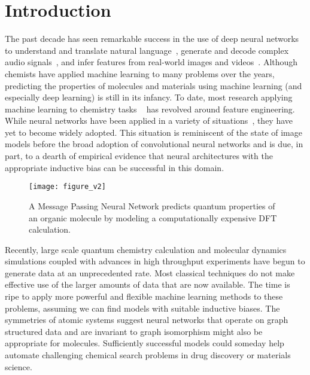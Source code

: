 \documentclass{article}
\begin{document}
\section{Introduction}

The past decade has seen remarkable success in the use of deep neural networks to understand and translate natural language~\cite{wu2016google}, generate and decode complex audio signals~\cite{hinton2012deep}, and infer features from real-world images and videos~\cite{krizhevsky2012imagenet}. Although chemists have applied machine learning to many problems over the years, predicting the properties of molecules and materials using machine learning (and especially deep learning) is still in its infancy. To date, most research applying machine learning to chemistry tasks ~\cite{bob,BAML,coloumb,rogers2010extended,montavon2012learning,behler2007,schoenholz2016}  has revolved around feature engineering. While neural networks have been applied in a variety of situations~\cite{merkwirth2005automatic, micheli2009neural, lusci2013deep, duvenaud2015}, they have yet to become widely adopted. This situation is reminiscent of the state of image models before the broad adoption of convolutional neural networks and is due, in part, to a dearth of empirical evidence that neural architectures with the appropriate inductive bias can be successful in this domain. 

\begin{figure}[t!]
\begin{center}
\label{fig:task}
\texttt{[image: figure\_v2]}
\end{center}
\caption{A Message Passing Neural Network predicts quantum properties of an organic molecule by modeling a computationally expensive DFT calculation.}

\end{figure}

Recently, large scale quantum chemistry calculation and molecular dynamics simulations coupled with advances in high throughput experiments have begun to generate data at an unprecedented rate. Most classical techniques do not make effective use of the larger amounts of data that are now available. The time is ripe to apply more powerful and flexible machine learning methods to these problems, assuming we can find models with suitable inductive biases. The symmetries of atomic systems suggest neural networks that operate on graph structured data and are invariant to graph isomorphism might also be appropriate for molecules. Sufficiently successful models could someday help automate challenging chemical search problems in drug discovery or materials science.
\end{document}
